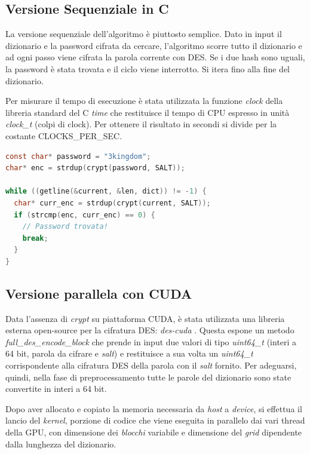 \documentclass[10pt,twocolumn,letterpaper]{article}
\begin{document}
\subsection{Versione Sequenziale in C}
La versione sequenziale dell'algoritmo è piuttosto semplice. Dato in input il dizionario e la password cifrata da cercare, l'algoritmo scorre tutto il dizionario e ad ogni passo viene cifrata la parola corrente con DES. Se i due hash sono uguali, la password è stata trovata e il ciclo viene interrotto. Si itera fino alla fine del dizionario. 

Per misurare il tempo di esecuzione è stata utilizzata la funzione \textit{clock} della libreria standard del C \textit{time} che restituisce il tempo di CPU espresso in unità \textit{clock\_t} (colpi di clock). Per ottenere il risultato in secondi si divide per la costante CLOCKS\_PER\_SEC.
\newline

\begin{lstlisting}[basicstyle=\footnotesize, language=C, frame=single, caption={Esempio di ricerca sequenziale nel dizionario}, captionpos=b]
const char* password = "3kingdom";
char* enc = strdup(crypt(password, SALT));

while ((getline(&current, &len, dict)) != -1) {
  char* curr_enc = strdup(crypt(current, SALT));
  if (strcmp(enc, curr_enc) == 0) {
    // Password trovata!
    break;
  }
}
\end{lstlisting}

\subsection{Versione parallela con CUDA}
Data l'assenza di \textit{crypt} su piattaforma CUDA, è stata utilizzata una libreria esterna open-source per la cifratura DES: \textit{des-cuda} \cite{DES-CUDA}.
Questa espone un metodo \textit{full\_des\_encode\_block} che prende in input due valori di tipo \textit{uint64\_t} (interi a 64 bit, parola da cifrare e \textit{salt}) e restituisce a sua volta un \textit{uint64\_t} corrispondente alla cifratura DES della parola con il \textit{salt} fornito. Per adeguarsi, quindi, nella fase di preprocessamento tutte le parole del dizionario sono state convertite in interi a 64 bit. 

Dopo aver allocato e copiato la memoria necessaria da \textit{host} a \textit{device}, si effettua il lancio del \textit{kernel}, porzione di codice che viene eseguita in parallelo dai vari thread della GPU, con dimensione dei \textit{blocchi} variabile e dimensione del \textit{grid} dipendente dalla lunghezza del dizionario.
\newline
\end{document}
